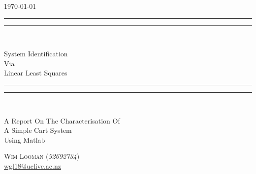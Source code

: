 \begin{titlepage}
\centering
\vspace*{\baselineskip}

\flushright\today\\
\centering
\rule{\textwidth}{1.6pt}\vspace*{-\baselineskip}\vspace*{2pt}
\rule{\textwidth}{0.4pt}\\[\baselineskip]

{\Huge \scshape

  System Identification\\
  Via\\
  Linear Least Squares

}

\rule{\textwidth}{0.4pt}\vspace*{-\baselineskip}\vspace*{3.2pt}
\rule{\textwidth}{1.6pt}\\[\baselineskip]
{\scshape \large

  A Report On The Characterisation Of\\
  A Simple Cart System\\
  Using Matlab

}


\vspace*{3\baselineskip}
{\Large

  {\scshape Wim Looman} (\emph{92692734})\\
  \url{wgl18@uclive.ac.nz}\\
}

\end{titlepage}

